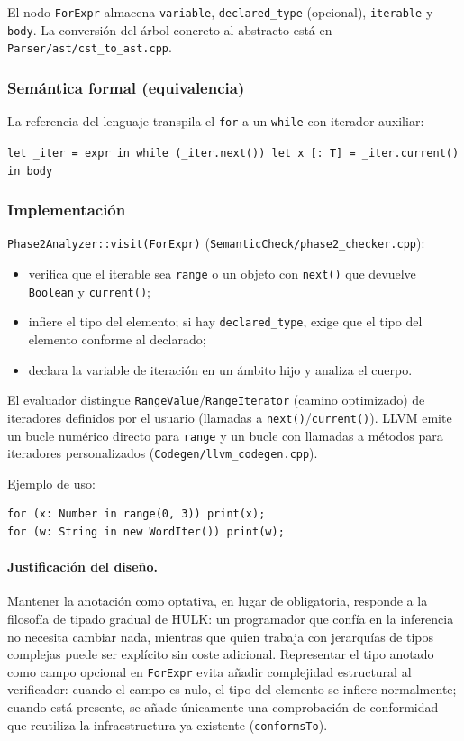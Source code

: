 \documentclass[11pt,a4paper]{article}
\begin{document}
El nodo \texttt{ForExpr} almacena \texttt{variable}, \texttt{declared\_type} (opcional), \texttt{iterable} y \texttt{body}. La conversión del árbol concreto al abstracto está en \texttt{Parser/ast/cst\_to\_ast.cpp}.

\subsubsection{Semántica formal (equivalencia)}

La referencia del lenguaje transpila el \texttt{for} a un \texttt{while} con iterador auxiliar:

\begin{center}
\small
\texttt{let \_iter = expr in while (\_iter.next()) let x [: T] = \_iter.current() in body}
\end{center}

\subsubsection{Implementación}

\texttt{Phase2Analyzer::visit(ForExpr)} (\texttt{SemanticCheck/phase2\_checker.cpp}):
\begin{itemize}
  \item verifica que el iterable sea \texttt{range} o un objeto con \texttt{next()} que devuelve \texttt{Boolean} y \texttt{current()};
  \item infiere el tipo del elemento; si hay \texttt{declared\_type}, exige que el tipo del elemento conforme al declarado;
  \item declara la variable de iteración en un ámbito hijo y analiza el cuerpo.
\end{itemize}

El evaluador distingue \texttt{RangeValue}/\texttt{RangeIterator} (camino optimizado) de iteradores definidos por el usuario (llamadas a \texttt{next()}/\texttt{current()}). LLVM emite un bucle numérico directo para \texttt{range} y un bucle con llamadas a métodos para iteradores personalizados (\texttt{Codegen/llvm\_codegen.cpp}).

Ejemplo de uso:

\begin{lstlisting}[language={},numbers=none]
for (x: Number in range(0, 3)) print(x);
for (w: String in new WordIter()) print(w);
\end{lstlisting}

\paragraph{Justificación del diseño.} Mantener la anotación como optativa, en lugar de obligatoria, responde a la filosofía de tipado gradual de HULK: un programador que confía en la inferencia no necesita cambiar nada, mientras que quien trabaja con jerarquías de tipos complejas puede ser explícito sin coste adicional. Representar el tipo anotado como campo opcional en \texttt{ForExpr} evita añadir complejidad estructural al verificador: cuando el campo es nulo, el tipo del elemento se infiere normalmente; cuando está presente, se añade únicamente una comprobación de conformidad que reutiliza la infraestructura ya existente (\texttt{conformsTo}).
\end{document}
